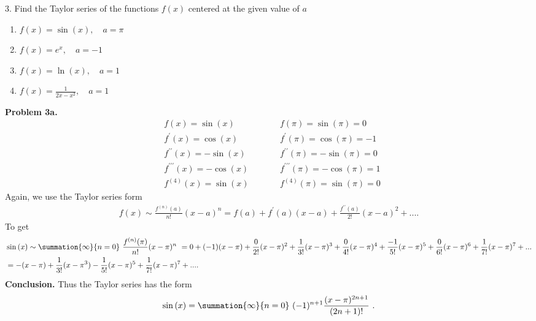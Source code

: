 \documentclass{report}
\begin{document}
    \bigbreak \noindent 
    \begin{mdframed}
        3. Find the Taylor series of the functions $f(x)$ centered at the given value of $a$
        \begin{enumerate}[label=(\alph*)]
            \item $f(x) = \sin{(x)}, \quad a=\pi $
            \item $f(x) = e^{x}, \quad  a =-1$
            \item $f(x) = \ln{(x)}, \quad  a = 1$
            \item $f(x) = \frac{1}{2x-x^{2}}, \quad  a = 1$
        \end{enumerate}
    \end{mdframed}
    \bigbreak \noindent 
    \textbf{Problem 3a.}
    \begin{equation}
    \begin{alignedat}{2}
        &f(x) = \sin{(x)} \quad \quad &&f(\pi) = \sin{(\pi)} = 0 \\
        &f^{\prime}(x) = \cos{(x)} \quad \quad &&f^{\prime}(\pi) = \cos{(\pi)} = -1 \\
        &f^{\prime\prime}(x) = -\sin{(x)} \quad \quad &&f^{\prime\prime}(\pi) = -\sin{(\pi)} = 0 \\
        &f^{\prime\prime\prime}(x) = -\cos{(x)} \quad \quad &&f^{\prime\prime\prime}(\pi) = -\cos{(\pi)} = 1 \\
        &f^{(4)}(x) = \sin{(x)} \quad \quad &&f^{(4)}(\pi) = \sin{(\pi)} = 0
    \end{alignedat}
    \end{equation}
    Again, we use the Taylor series form
    \begin{align*}
        f(x) \sim \frac{f^{(n)}(a)}{n!}(x-a)^{n} = f(a) + f^{\prime}(a)(x-a) + \frac{f^{\prime\prime}(a)}{2!}(x-a)^{2}  + ...
    .\end{align*}
    To get 
    \begin{align*}
        &\sin{(x)} \sim \summation{\infty}{n=0}\ \frac{f^{(n)}(\pi)}{n!}(x-\pi)^{n}\  = 0 + (-1)(x-\pi) + \frac{0}{2!}(x-\pi)^{2}+\frac{1}{3!}(x-\pi)^{3}  + \frac{0}{4!}(x-\pi)^{4} + \frac{-1}{5!}(x-\pi)^{5} + \frac{0}{6!}(x-\pi)^{6} +\frac{1}{7!}(x-\pi)^{7} +...\\
        &=-(x-\pi)+ \frac{1}{3!}(x-\pi^{3})-\frac{1}{5!}(x-\pi)^{5}+\frac{1}{7!}(x-\pi)^{7} +...
    .\end{align*}
    \textbf{Conclusion.} Thus the Taylor series has the form
    \begin{align*}
        \sin{(x)} = \summation{\infty}{n=0}\ (-1)^{n+1}\frac{(x-\pi)^{2n+1}}{(2n+1)!}\ 
    .\end{align*}
\end{document}
